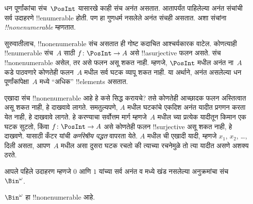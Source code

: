 \documentclass[../../../include/open-logic-section]{subfiles}
\begin{document}









धन पूर्णांकांचा संच~$\PosInt$ यासारखे काही संच अनंत असतात. आतापर्यंत
पाहिलेल्या अनंत संचांची सर्व उदाहरणे !!{enumerable} होती. पण हा गुणधर्म
नसलेले अनंत संचही असतात. अशा संचांना \emph{!!{nonenumerable}} म्हणतात.

सुरुवातीलाच, !!{nonenumerable} संच असतात ही गोष्ट कदाचित आश्चर्यकारक
वाटेल. कोणत्याही !!{enumerable} संच~$A$ साठी $f \colon \PosInt \to A$
असे !!a{surjective} फलन असते. संच !!{nonenumerable} असेल, तर असे फलन
असू शकत नाही. म्हणजे, $\PosInt$ मधील अनंत ना~$A$ कडे
पाठवणारे कोणतेही फलन~$A$ मधील सर्व घटक व्यापू शकत नाही. या अर्थाने,
अनंत असलेल्या धन पूर्णांकांपेक्षा~$A$ मध्ये ``अधिक'' !!{element}s असतात.

एखादा संच !!{nonenumerable} आहे हे कसे सिद्ध करायचे? तसे कोणतेही
आच्छादक फलन अस्तित्वात असू शकत नाही, हे दाखवावे लागते. समतुल्यपणे,
$A$ मधील घटकांचे एकदिश अनंत यादीत प्रगणन करता येत नाही, हे दाखवावे
लागते. हे करण्याचा सर्वोत्तम मार्ग म्हणजे~$A$ मधील च्या
प्रत्येक यादीतून किमान एक घटक सुटतो, किंवा $f\colon \PosInt \to A$
असे कोणतेही फलन !!{surjective} असू शकत नाही, हे दाखवणे. यासाठी कँटर
यांची \emph{कर्णरेषीय पद्धत} वापरता येते. $A$ मधील ची
एखादी यादी, म्हणजे $x_1$, $x_2$, \dots, दिली असता, आपण~$A$ मधील असा
दुसरा घटक रचतो की त्याच्या रचनेमुळे तो त्या यादीत असणे अशक्य ठरते.

आपले पहिले उदाहरण म्हणजे $0$ आणि $1$ यांच्या सर्व अनंत व मध्ये खंड
नसलेल्या अनुक्रमांचा संच~$\Bin^\omega$.

\begin{thm}
$\Bin^\omega$ हा !!{nonenumerable} आहे.
\end{thm}
\end{document}
